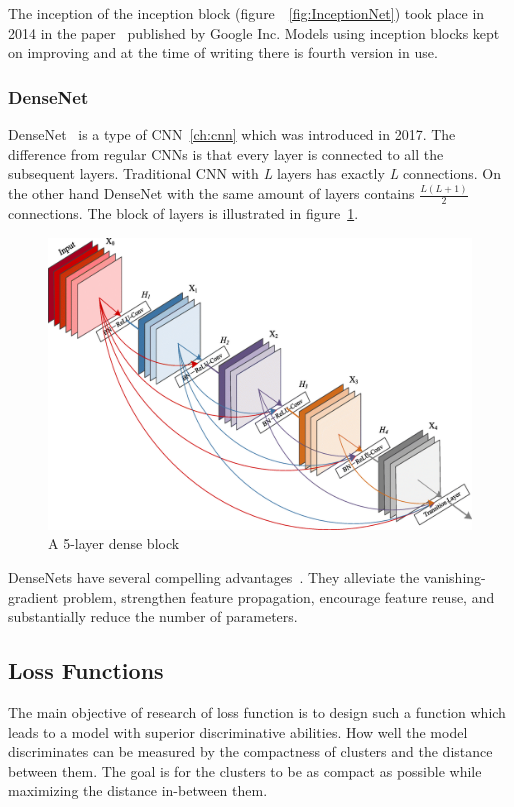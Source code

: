 The inception of the inception block (figure~~\ref{fig:InceptionNet}) took place in 2014 in the paper~\cite{GoingDeeper}
published by Google Inc.
Models using inception blocks kept on improving and at the time of writing there is fourth version in use.

\subsubsection{DenseNet}\label{subsubsec:densenet}
DenseNet~\cite{DenseNet} is a type of CNN~\ref{ch:cnn} which was introduced in 2017.
The difference from regular CNNs is that every layer is connected to all the subsequent layers.
Traditional CNN with \textit{L} layers has exactly \textit{L} connections.
On the other hand DenseNet with the same amount of layers contains $\frac{L\left( L+1 \right)}{2}$ connections.
The block of layers is illustrated in figure~\ref{fig:DenseNet}.

\begin{figure}[H]
    \centering
    \includegraphics[width=0.9\columnwidth]{images/face-recognition/densenet.png}
    \caption{A 5-layer dense block~\cite{DenseNet}}
    \label{fig:DenseNet}
\end{figure}

DenseNets have several compelling advantages~\cite{DenseNet}.
They alleviate the vanishing-gradient problem, strengthen feature propagation, encourage feature reuse, and
substantially reduce the number of parameters.

\subsection{Loss Functions}\label{subsec:loss-functions}
The main objective of research of loss function is to design such a function which leads to a model with superior
discriminative abilities.
How well the model discriminates can be measured by the compactness of clusters and the distance between them.
The goal is for the clusters to be as compact as possible while maximizing the distance in-between them.


